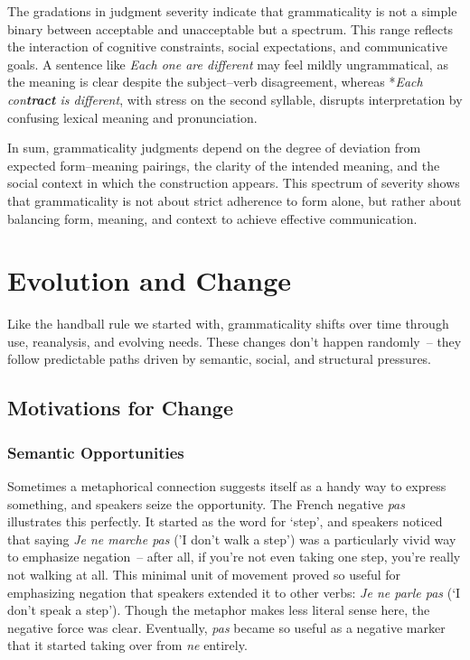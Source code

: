 The gradations in judgment severity indicate that grammaticality is not a simple binary between acceptable and unacceptable but a spectrum. This range reflects the interaction of cognitive constraints, social expectations, and communicative goals. A sentence like \textit{Each one are different} may feel mildly ungrammatical, as the meaning is clear despite the subject–verb disagreement, whereas *\textit{Each con\textbf{tract} is different}, with stress on the second syllable, disrupts interpretation by confusing lexical meaning and pronunciation.

In sum, grammaticality judgments depend on the degree of deviation from expected form–meaning pairings, the clarity of the intended meaning, and the social context in which the construction appears. This spectrum of severity shows that grammaticality is not about strict adherence to form alone, but rather about balancing form, meaning, and context to achieve effective communication.


\section{Evolution and Change}

Like the handball rule we started with, grammaticality shifts over time through use, reanalysis, and evolving needs. These changes don't happen randomly~-- they follow predictable paths driven by semantic, social, and structural pressures.

\subsection{Motivations for Change}

\subsubsection{Semantic Opportunities}
Sometimes a metaphorical connection suggests itself as a handy way to express something, and speakers seize the opportunity. The French negative \textit{pas} illustrates this perfectly. It started as the word for `step', and speakers noticed that saying \textit{Je ne marche pas} ('I don't walk a step') was a particularly vivid way to emphasize negation~-- after all, if you're not even taking one step, you're really not walking at all. This minimal unit of movement proved so useful for emphasizing negation that speakers extended it to other verbs: \textit{Je ne parle pas} (`I don't speak a step'). Though the metaphor makes less literal sense here, the negative force was clear. Eventually, \textit{pas} became so useful as a negative marker that it started taking over from \textit{ne} entirely.

